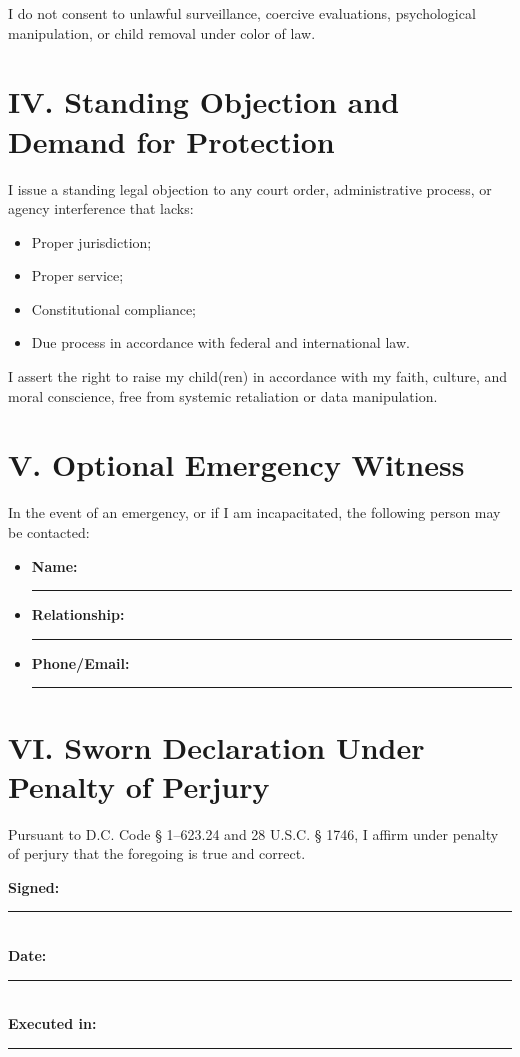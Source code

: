 \documentclass[12pt,letterpaper]{article}
\begin{document}
I do not consent to unlawful surveillance, coercive evaluations, psychological manipulation, or child removal under color of law.

\section*{IV. Standing Objection and Demand for Protection}

I issue a standing legal objection to any court order, administrative process, or agency interference that lacks:
\begin{itemize}
  \item Proper jurisdiction;
  \item Proper service;
  \item Constitutional compliance;
  \item Due process in accordance with federal and international law.
\end{itemize}

I assert the right to raise my child(ren) in accordance with my faith, culture, and moral conscience, free from systemic retaliation or data manipulation.

\section*{V. Optional Emergency Witness}

In the event of an emergency, or if I am incapacitated, the following person may be contacted:

\begin{itemize}
  \item \textbf{Name:} \rule{10cm}{0.4pt}
  \item \textbf{Relationship:} \rule{9cm}{0.4pt}
  \item \textbf{Phone/Email:} \rule{9cm}{0.4pt}
\end{itemize}

\section*{VI. Sworn Declaration Under Penalty of Perjury}

Pursuant to D.C. Code § 1–623.24 and 28 U.S.C. § 1746, I affirm under penalty of perjury that the foregoing is true and correct.

\vspace{2em}

\noindent
\textbf{Signed:} \rule{8cm}{0.4pt} \\
\textbf{Date:} \rule{5cm}{0.4pt} \\
\textbf{Executed in:} \rule{6cm}{0.4pt}
\end{document}
